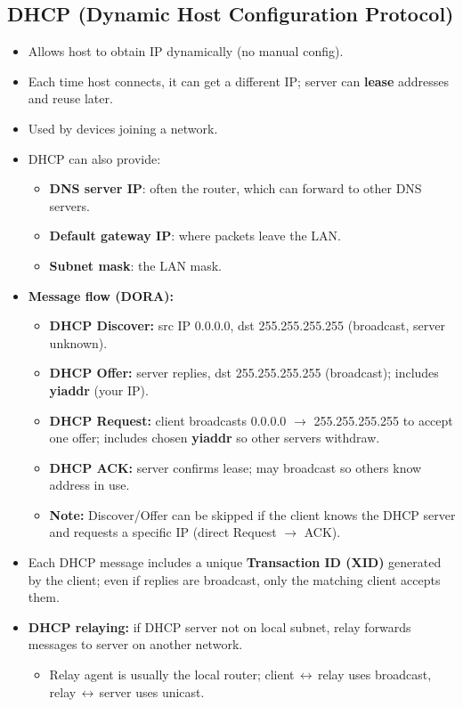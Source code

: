 \subsection{DHCP (Dynamic Host Configuration Protocol)}
\begin{itemize}
	\item Allows host to obtain IP dynamically (no manual config).
	\item Each time host connects, it can get a different IP; server can \textbf{lease} addresses and reuse later.
	\item Used by devices joining a network.
	\item DHCP can also provide:
	\begin{itemize}
		\item \textbf{DNS server IP}: often the router, which can forward to other DNS servers.
		\item \textbf{Default gateway IP}: where packets leave the LAN.
		\item \textbf{Subnet mask}: the LAN mask.
	\end{itemize}
	\item \textbf{Message flow (DORA):}
	\begin{itemize}
		\item \textbf{DHCP Discover:} src IP 0.0.0.0, dst 255.255.255.255 (broadcast, server unknown).
		\item \textbf{DHCP Offer:} server replies, dst 255.255.255.255 (broadcast); includes \textbf{yiaddr} (your IP).
		\item \textbf{DHCP Request:} client broadcasts 0.0.0.0 $\to$ 255.255.255.255 to accept one offer; includes chosen \textbf{yiaddr} so other servers withdraw.
		\item \textbf{DHCP ACK:} server confirms lease; may broadcast so others know address in use.
		\item \textbf{Note:} Discover/Offer can be skipped if the client knows the DHCP server and requests a specific IP (direct Request $\to$ ACK).
	\end{itemize}
	\item Each DHCP message includes a unique \textbf{Transaction ID (XID)} generated by the client; even if replies are broadcast, only the matching client accepts them.
	\item \textbf{DHCP relaying:} if DHCP server not on local subnet, relay forwards messages to server on another network.
	\begin{itemize}
		\item Relay agent is usually the local router; client\,$\leftrightarrow$\,relay uses broadcast, relay\,$\leftrightarrow$\,server uses unicast.

\end{itemize}
\end{itemize}
